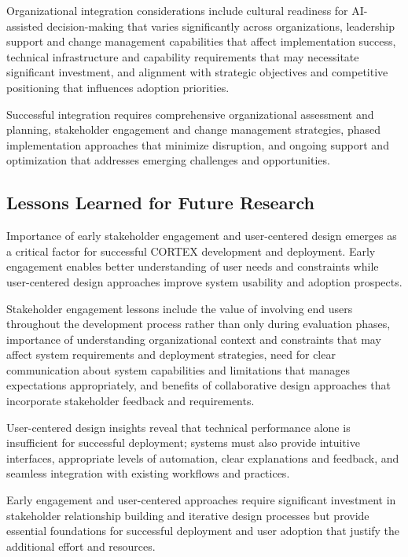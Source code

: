 Organizational integration considerations include cultural readiness for AI-assisted decision-making that varies significantly across organizations, leadership support and change management capabilities that affect implementation success, technical infrastructure and capability requirements that may necessitate significant investment, and alignment with strategic objectives and competitive positioning that influences adoption priorities.

Successful integration requires comprehensive organizational assessment and planning, stakeholder engagement and change management strategies, phased implementation approaches that minimize disruption, and ongoing support and optimization that addresses emerging challenges and opportunities.

\subsection{Lessons Learned for Future Research}

Importance of early stakeholder engagement and user-centered design emerges as a critical factor for successful CORTEX development and deployment. Early engagement enables better understanding of user needs and constraints while user-centered design approaches improve system usability and adoption prospects.

Stakeholder engagement lessons include the value of involving end users throughout the development process rather than only during evaluation phases, importance of understanding organizational context and constraints that may affect system requirements and deployment strategies, need for clear communication about system capabilities and limitations that manages expectations appropriately, and benefits of collaborative design approaches that incorporate stakeholder feedback and requirements.

User-centered design insights reveal that technical performance alone is insufficient for successful deployment; systems must also provide intuitive interfaces, appropriate levels of automation, clear explanations and feedback, and seamless integration with existing workflows and practices.

Early engagement and user-centered approaches require significant investment in stakeholder relationship building and iterative design processes but provide essential foundations for successful deployment and user adoption that justify the additional effort and resources.

